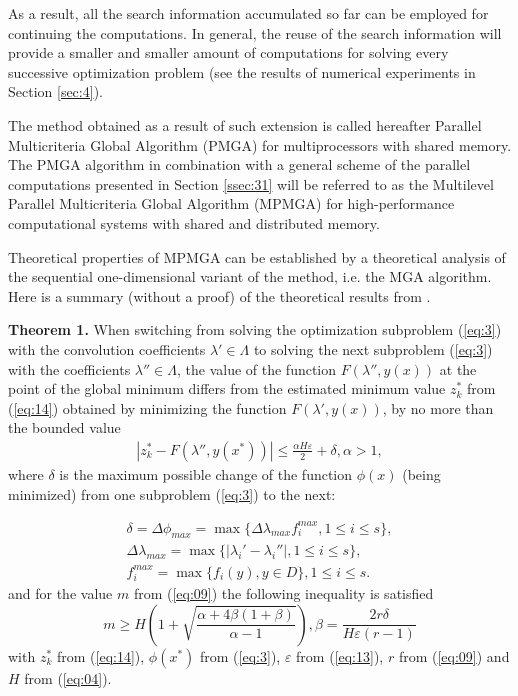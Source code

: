\documentclass[runningheads]{llncs}
\begin{document}
As a result, all the search information accumulated so far can be employed for continuing the computations. In general, the reuse of the search information will provide a smaller and smaller amount of computations for solving every successive optimization problem (see the results of numerical experiments in Section \ref{sec:4}).

The method obtained as a result of such extension is called hereafter Parallel Multicriteria Global Algorithm (PMGA) for multiprocessors with shared memory. The PMGA algorithm in combination with a general scheme of the parallel computations presented in Section \ref{ssec:31} will be referred to as the Multilevel Parallel Multicriteria Global Algorithm (MPMGA) for high-performance computational systems with shared and distributed memory.

Theoretical properties of MPMGA can be established by a theoretical analysis of the sequential one-dimensional variant of the method, i.e. the MGA algorithm. Here is a summary (without a proof) of the theoretical results from \cite{c16}.

\textbf{Theorem 1.} When switching from solving the optimization subproblem (\ref{eq:3}) with the convolution coefficients $\lambda' \in \Lambda$ to solving the next subproblem (\ref{eq:3}) with the coefficients $\lambda'' \in \Lambda$, the value of the function $F(\lambda'',y(x))$ at the point of the global minimum differs from the estimated minimum value $z_k^*$ from (\ref{eq:14}) obtained by minimizing the function $F(\lambda',y(x))$, by no more than the bounded value 
\begin{eqnarray} \label{eq:16}
|z_k^*-F(\lambda'',y(x^*))| \leq \frac{\alpha H \varepsilon}{2} + \delta, \alpha>1,
\end{eqnarray} 
where $\delta$ is the maximum possible change of the function $\phi(x)$ (being minimized) from one subproblem (\ref{eq:3}) to the next:

\begin{equation} \label{eq:17}
\begin{split}
\delta=\Delta \phi_{max}=\max{\{\Delta \lambda_{max} f_i^{max}, 1 \leq i \leq s \}},\\
\Delta \lambda_{max}=\max{\{|\lambda_i'-\lambda_i'' |, 1 \leq i \leq s\}},	\\
f_i^{max} = \max {\{f_i (y), y \in D\} }, 1 \leq i \leq s.
\end{split}
\end{equation} 
and for the value $m$ from (\ref{eq:09}) the following inequality is satisfied
\begin{equation*}
m \geq H\left(1+\sqrt{\frac{\alpha+4\beta(1+\beta)}{\alpha-1}} \right), \beta = \frac{2r\delta}{H\varepsilon(r-1)}
\end{equation*} 
with $z_k^*$ from (\ref{eq:14}), $\phi(x^*)$ from (\ref{eq:3}), $\varepsilon$ from (\ref{eq:13}), $r$ from (\ref{eq:09}) and $H$ from (\ref{eq:04}).
\end{document}
